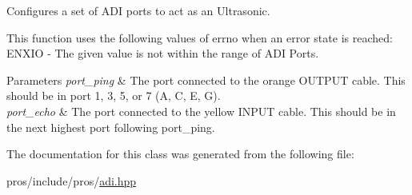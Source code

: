 Configures a set of A\+DI ports to act as an Ultrasonic. 

This function uses the following values of errno when an error state is reached\+: E\+N\+X\+IO -\/ The given value is not within the range of A\+DI Ports.


\begin{DoxyParams}{Parameters}
{\em port\+\_\+ping} & The port connected to the orange O\+U\+T\+P\+UT cable. This should be in port 1, 3, 5, or 7 (\textquotesingle{}A\textquotesingle{}, \textquotesingle{}C\textquotesingle{}, \textquotesingle{}E\textquotesingle{}, \textquotesingle{}G\textquotesingle{}). \\
\hline
{\em port\+\_\+echo} & The port connected to the yellow I\+N\+P\+UT cable. This should be in the next highest port following port\+\_\+ping. \\
\hline
\end{DoxyParams}


The documentation for this class was generated from the following file\+:\begin{DoxyCompactItemize}
\item 
pros/include/pros/\hyperlink{adi_8hpp}{adi.\+hpp}\end{DoxyCompactItemize}
